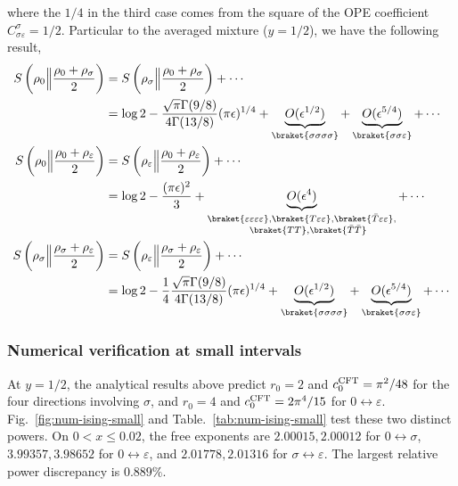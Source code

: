 \documentclass[11pt]{article}
\newcommand{\ep}{\epsilon}
\newcommand{\lb}{\left(}
\newcommand{\rb}{\right)}
\begin{document}
where the $1/4$ in the third case comes from the square of the OPE coefficient $C^\sigma_{\sigma\varepsilon} = 1/2$. Particular to the averaged mixture ($y =1/2$), we have the following result,
\begin{align}
    S\lb \rho_0 \Big\|\frac{\rho_0 + \rho_\sigma}{2}\rb &= S\lb \rho_\sigma \Big\|\frac{\rho_0 + \rho_\sigma}{2}\rb +\cdots\\ &=\log 2 - \frac{\sqrt \pi \Gamma(9/8)}{4\Gamma (13/8)} (\pi \ep)^{1/4} + \underbrace{O(\ep^{1/2})}_{\braket{\sigma\sigma\sigma\sigma}}+ \underbrace{O(\ep^{5/4})}_{\braket{\sigma\sigma\varepsilon}}+\cdots \\
    S\lb \rho_0 \Big\|\frac{\rho_0 + \rho_\varepsilon}{2}\rb &= S\lb \rho_\varepsilon \Big\|\frac{\rho_0 + \rho_\varepsilon}{2}\rb+\cdots \\&= \log 2 -  \frac{(\pi \ep)^{2}}{3} + \underbrace{O(\ep^{4})}_{\substack{\braket{\varepsilon\varepsilon\varepsilon\varepsilon} ,\braket{T\varepsilon\varepsilon}, \braket{\bar T \varepsilon\varepsilon},\\\quad \braket{TT},\braket{\bar T \bar T}}}+\cdots \\
    S\lb \rho_\sigma \Big\|\frac{\rho_\sigma + \rho_\varepsilon}{2}\rb &= S\lb \rho_\varepsilon \Big\|\frac{\rho_\sigma + \rho_\varepsilon}{2}\rb +\cdots  \\&=\log 2 - \frac{1}{4}\frac{\sqrt \pi \Gamma(9/8)}{4\Gamma (13/8)} (\pi \ep)^{1/4} + \underbrace{O(\ep^{1/2})}_{\braket{\sigma\sigma\sigma\sigma}} +\underbrace{O(\ep^{5/4})}_{\braket{\sigma\sigma\varepsilon}}+\cdots 
\end{align}

\subsubsection{Numerical verification at small intervals}
\label{sec:num-ising-small}
At $y=1/2$, the analytical results above predict
$r_0=2$ and $c_0^{\rm CFT}=\pi^2/48$ for the four directions
involving $\sigma$, and $r_0=4$ and
$c_0^{\rm CFT}=2\pi^4/15$ for $0\leftrightarrow\varepsilon$.
Fig.~\ref{fig:num-ising-small} and
Table.~\ref{tab:num-ising-small} test these two distinct powers.
On $0<x\leq0.02$, the free exponents are
$2.00015,2.00012$ for $0\leftrightarrow\sigma$,
$3.99357,3.98652$ for $0\leftrightarrow\varepsilon$, and
$2.01778,2.01316$ for $\sigma\leftrightarrow\varepsilon$.
The largest relative power discrepancy is $0.889\%$.
\end{document}
